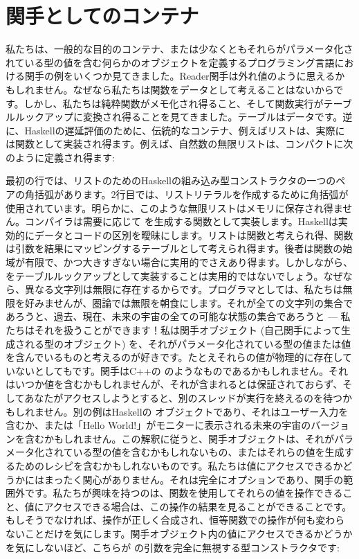 \section{関手としてのコンテナ}

私たちは、一般的な目的のコンテナ、または少なくともそれらがパラメータ化されている型の値を含む何らかのオブジェクトを定義するプログラミング言語における関手の例をいくつか見てきました。Reader関手は外れ値のように思えるかもしれません。なぜなら私たちは関数をデータとして考えることはないからです。しかし、私たちは純粋関数がメモ化され得ること、そして関数実行がテーブルルックアップに変換され得ることを見てきました。テーブルはデータです。逆に、Haskellの遅延評価のために、伝統的なコンテナ、例えばリストは、実際には関数として実装され得ます。例えば、自然数の無限リストは、コンパクトに次のように定義され得ます: 

最初の行では、リストのためのHaskellの組み込み型コンストラクタの一つのペアの角括弧があります。2行目では、リストリテラルを作成するために角括弧が使用されています。明らかに、このような無限リストはメモリに保存され得ません。コンパイラは需要に応じて  を生成する関数として実装します。Haskellは実効的にデータとコードの区別を曖昧にします。リストは関数と考えられ得、関数は引数を結果にマッピングするテーブルとして考えられ得ます。後者は関数の始域が有限で、かつ大きすぎない場合に実用的でさえあり得ます。しかしながら、 をテーブルルックアップとして実装することは実用的ではないでしょう。なぜなら、異なる文字列は無限に存在するからです。プログラマとしては、私たちは無限を好みませんが、圏論では無限を朝食にします。それが全ての文字列の集合であろうと、過去、現在、未来の宇宙の全ての可能な状態の集合であろうと --- 私たちはそれを扱うことができます！私は関手オブジェクト (自己関手によって生成される型のオブジェクト) を、それがパラメータ化されている型の値または値を含んでいるものと考えるのが好きです。たとえそれらの値が物理的に存在していないとしてもです。関手はC++の  のようなものであるかもしれません。それはいつか値を含むかもしれませんが、それが含まれるとは保証されておらず、そしてあなたがアクセスしようとすると、別のスレッドが実行を終えるのを待つかもしれません。別の例はHaskellの  オブジェクトであり、それはユーザー入力を含むか、または「Hello World!」がモニターに表示される未来の宇宙のバージョンを含むかもしれません。この解釈に従うと、関手オブジェクトは、それがパラメータ化されている型の値を含むかもしれないもの、またはそれらの値を生成するためのレシピを含むかもしれないものです。私たちは値にアクセスできるかどうかにはまったく関心がありません。それは完全にオプションであり、関手の範囲外です。私たちが興味を持つのは、関数を使用してそれらの値を操作できること、値にアクセスできる場合は、この操作の結果を見ることができることです。もしそうでなければ、操作が正しく合成され、恒等関数での操作が何も変わらないことだけを気にします。関手オブジェクト内の値にアクセスできるかどうかを気にしないほど、こちらが  の引数を完全に無視する型コンストラクタです: 

